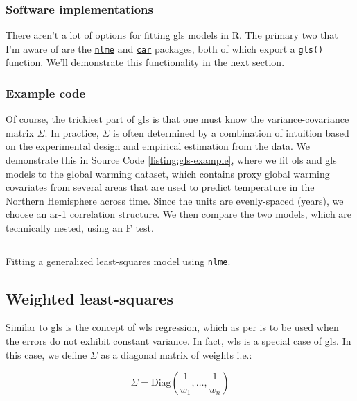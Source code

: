 \documentclass{report}
\begin{document}
\subsubsection{Software implementations}

There aren't a lot of options for fitting \gls{gls} models in R. The primary two that I'm aware of are the \href{https://cran.r-project.org/web/packages/nlme/index.html}{\texttt{nlme}} and \href{https://cran.r-project.org/web/packages/car/index.html}{\texttt{car}} packages, both of which export a \texttt{gls()} function. We'll demonstrate this functionality in the next section. 

\subsubsection{Example code}

Of course, the trickiest part of \gls{gls} is that one must know the variance-covariance matrix $\Sigma$. In practice, $\Sigma$ is often determined by a combination of intuition based on the experimental design and empirical estimation from the data. We demonstrate this in Source Code \ref{listing:gls-example}, where we fit \gls{ols} and \gls{gls} models to the global warming dataset, which contains proxy global warming covariates from several areas that are used to predict temperature in the Northern Hemisphere across time. Since the units are evenly-spaced (years), we choose an \gls{ar}-1 correlation structure. We then compare the two models, which are technically nested, using an F test. 

\begin{listing}[h!]
\inputminted{r}{Example-Code/generalized_least_squares.R}
\caption{Fitting a generalized least-squares model using \texttt{nlme}.}
\label{listing:gls-example}
\end{listing}

\subsection{Weighted least-squares}

Similar to \gls{gls} is the concept of \gls{wls} regression, which as per \cite[Chapter~8.2]{faraway_linear_2015} is to be used when the errors do not exhibit constant variance. In fact, \gls{wls} is a special case of \gls{gls}. In this case, we define $\Sigma$ as a diagonal matrix of weights i.e.:

\begin{equation}\label{eq:ols-wls-sigma-form}
    \Sigma = \text{Diag}\left(\frac{1}{w_1}, \dots, \frac{1}{w_n}\right)
\end{equation}
\end{document}
